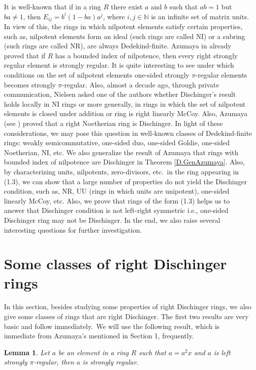 \documentclass[12pt]{article}
\theoremstyle{plain}
\newtheorem{lemma}[thm]{Lemma}
\theoremstyle{definition}
\begin{document}
\par It is well-known that if in a ring $R$ there exist $a$ and $b$ such that $ab=1$ but $ba \neq 1$, then $ E_{ij}=b^i(1-ba)a^j$, where $i,j \in \mathbb{N}$ is an infinite set of matrix units. In view of this, the rings in which nilpotent elements satisfy certain properties, such as, nilpotent elements form an ideal (such rings are called NI) or a subring (such rings are called NR), are always Dedekind-finite. Azumaya in \cite[Theorem 4]{Az} already proved that if $R$ has a bounded index of nilpotence, then every right strongly regular element is strongly regular. It is quite interesting to see under which conditions on the set of nilpotent elements one-sided strongly $\pi$-regular elements becomes strongly $\pi$-regular. Also, almost a decade ago, through private communication, Nielsen asked one of the authors whether Dischinger's result holds locally in NI rings or more generally, in rings in which the set of nilpotent elements is closed under addition or ring is right linearly McCoy. Also, Azumaya (see \cite[Theorem 2]{Az}) proved that a right Noetherian ring is Dischinger. In light of these considerations, we may pose this question in well-known classes of Dedekind-finite rings: weakly semicommutative, one-sided duo, one-sided Goldie, one-sided Noetherian, NI, etc. We also generalize the result of Azumaya \cite[Theorem 4]{Az} that rings with bounded index of nilpotence are Dischinger in Theorem \ref{D.GenAzumaya}.  Also, by characterizing units, nilpotents, zero-divisors, etc.\ in the ring appearing in (1.3), we can show that a large number of properties do not yield the Dischinger condition, such as, NR, UU (rings in which units are unipotent), one-sided linearly McCoy, etc. Also, we prove that rings of the form (1.3) helps us to answer that Dischinger condition is not left-right symmetric i.e., one-sided Dischinger ring may not be Dischinger. In the end, we also raise several interesting questions for further investigation.

\section{ Some classes of right Dischinger rings}
In this section, besides studying some properties of right Dischinger rings, we also give some classes of rings that are right Dischinger. The first two results are very basic and follow immediately.\ We will use the following result, which is immediate from Azumaya's \cite[Lemma 3]{Az} mentioned in Section 1, frequently. 
	\begin{lemma}\label{D.Lemma1}
Let $a$ be an element in a ring $R$ such that $a=a^2x$ and $a$ is left strongly $\pi$-regular, then $a$ is strongly regular.
	\end{lemma}
	
\end{document}
